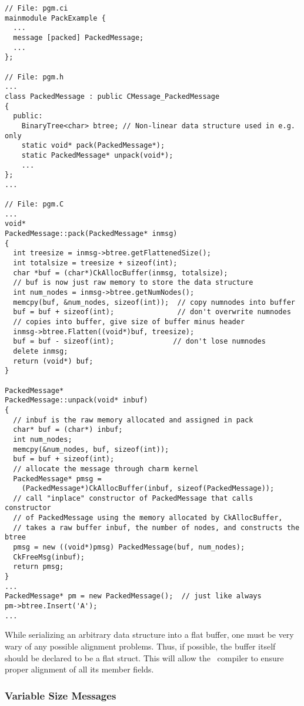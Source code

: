 \begin{verbatim}
// File: pgm.ci
mainmodule PackExample {
  ...
  message [packed] PackedMessage;
  ...
};

// File: pgm.h
...
class PackedMessage : public CMessage_PackedMessage
{
  public:
    BinaryTree<char> btree; // Non-linear data structure used in e.g. only 
    static void* pack(PackedMessage*);
    static PackedMessage* unpack(void*);
    ...
};
...

// File: pgm.C
...
void*
PackedMessage::pack(PackedMessage* inmsg)
{
  int treesize = inmsg->btree.getFlattenedSize();
  int totalsize = treesize + sizeof(int);
  char *buf = (char*)CkAllocBuffer(inmsg, totalsize);
  // buf is now just raw memory to store the data structure
  int num_nodes = inmsg->btree.getNumNodes();
  memcpy(buf, &num_nodes, sizeof(int));  // copy numnodes into buffer
  buf = buf + sizeof(int);               // don't overwrite numnodes
  // copies into buffer, give size of buffer minus header
  inmsg->btree.Flatten((void*)buf, treesize);    
  buf = buf - sizeof(int);              // don't lose numnodes
  delete inmsg;
  return (void*) buf;
}

PackedMessage*
PackedMessage::unpack(void* inbuf)
{
  // inbuf is the raw memory allocated and assigned in pack
  char* buf = (char*) inbuf;
  int num_nodes;
  memcpy(&num_nodes, buf, sizeof(int));
  buf = buf + sizeof(int);
  // allocate the message through charm kernel
  PackedMessage* pmsg = 
    (PackedMessage*)CkAllocBuffer(inbuf, sizeof(PackedMessage));
  // call "inplace" constructor of PackedMessage that calls constructor
  // of PackedMessage using the memory allocated by CkAllocBuffer,
  // takes a raw buffer inbuf, the number of nodes, and constructs the btree
  pmsg = new ((void*)pmsg) PackedMessage(buf, num_nodes);  
  CkFreeMsg(inbuf);
  return pmsg;
}
... 
PackedMessage* pm = new PackedMessage();  // just like always 
pm->btree.Insert('A');
...
\end{verbatim}


While serializing an arbitrary data structure into a flat buffer, one
must be very wary of any possible alignment problems.  Thus, if
possible, the buffer itself should be declared to be a flat struct.
This will allow the \CC\ compiler to ensure proper alignment of all
its member fields.


\subsubsection{Variable Size Messages}
\label{varsize messages}

